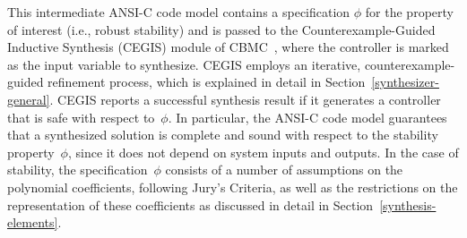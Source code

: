 \documentclass[final]{sig-alternate-05-2015}
\begin{document}
This intermediate ANSI-C code model contains a specification $\phi$ for the
property of interest (i.e., robust stability) and is passed to the
Counterexample-Guided Inductive Synthesis (CEGIS) module of
CBMC~\cite{ClarkeKL04}, where the controller is marked as the input variable
to synthesize.  CEGIS employs an iterative, counterexample-guided refinement
process, which is explained in detail in Section~\ref{synthesizer-general}. 
CEGIS reports a successful synthesis result if it generates a controller
that is safe with respect to~$\phi$.  In particular, the ANSI-C code model
guarantees that a synthesized solution is complete and sound with respect to
the stability property~$\phi$, since it does not depend on system inputs and
outputs.  In the case of stability, the specification~$\phi$ consists of a
number of assumptions on the polynomial coefficients, following Jury's
Criteria, as well as the restrictions on the representation of these
coefficients as discussed in detail in Section~\ref{synthesis-elements}.


%
\end{document}
